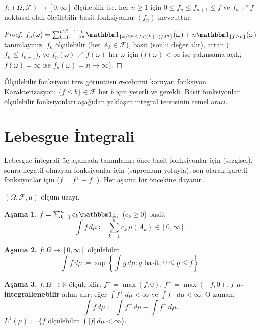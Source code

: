 \begin{teorem}\label{thm:basityaklasim}
$f: (\Omega, \mathcal{F}) \to [0,\infty]$ ölçülebilir ise, her $n \geq 1$ için
$0 \leq f_n \leq f_{n+1} \leq f$ ve $f_n \nearrow f$ noktasal olan ölçülebilir
basit fonksiyonlar $(f_n)$ mevcuttur.
\end{teorem}

\begin{proof}
$f_n(\omega) = \sum_{k=0}^{n 2^n - 1} \frac{k}{2^n} \gostf{\{k/2^n \leq f < (k+1)/2^n\}}(\omega) + n \gostf{\{f \geq n\}}(\omega)$
tanımlayınız. $f_n$ ölçülebilir (her $A_k \in \mathcal{F}$), basit (sonlu değer alır),
artan ($f_n \leq f_{n+1}$), ve $f_n(\omega) \nearrow f(\omega)$ her $\omega$ için
($f(\omega) < \infty$ ise yakınsama açık; $f(\omega) = \infty$ ise $f_n(\omega) = n \to \infty$).
\end{proof}

\begin{mikroozet}[§1.5 özeti]
Ölçülebilir fonksiyon: ters görüntüsü $\sigma$-cebirini koruyan fonksiyon.
Karakterizasyon: $\{f \leq b\} \in \mathcal{F}$ her $b$ için yeterli ve gerekli.
Basit fonksiyonlar ölçülebilir fonksiyonları aşağıdan yaklaşır: integral
teorisinin temel aracı.
\end{mikroozet}


\section{Lebesgue İntegrali}

\begin{motivasyon}[§1.6]
Lebesgue integrali üç aşamada tanımlanır: önce basit fonksiyonlar için
(sezgisel), sonra negatif olmayan fonksiyonlar için (supremum yoluyla),
son olarak işaretli fonksiyonlar için ($f = f^+ - f^-$). Her aşama
bir öncekine dayanır.
\end{motivasyon}

\begin{tanim}\label{def:lebesgueintegral}
$(\Omega, \mathcal{F}, \mu)$ ölçüm uzayı.

\medskip

\textbf{Aşama 1.} $f = \sum_{k=1}^n c_k \gostf{A_k}$ ($c_k \geq 0$) basit:
\[
  \int f \, d\mu \coloneqq \sum_{k=1}^n c_k \, \mu(A_k) \in [0,\infty].
\]

\textbf{Aşama 2.} $f: \Omega \to [0,\infty]$ ölçülebilir:
\[
  \int f \, d\mu \coloneqq \sup\left\{ \int g \, d\mu :
    g \text{ basit, } 0 \leq g \leq f \right\}.
\]

\textbf{Aşama 3.} $f: \Omega \to \mathbb{R}$ ölçülebilir. $f^+ = \max(f,0)$,
$f^- = \max(-f,0)$. $f$ \textbf{$\mu$-integrallenebilir} adını alır; eğer
$\int f^+ \, d\mu < \infty$ ve $\int f^- \, d\mu < \infty$. O zaman:
\[
  \int f \, d\mu \coloneqq \int f^+ \, d\mu - \int f^- \, d\mu.
\]
$L^1(\mu) \coloneqq \{f \text{ ölçülebilir} : \int |f| \, d\mu < \infty\}$.
\end{tanim}

